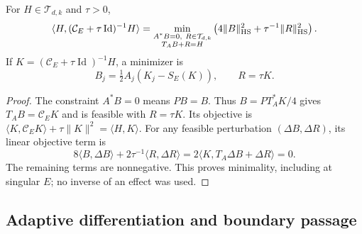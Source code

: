\begin{lemma}
\label{lem:horizontalenergy83}
For $H\in\mathcal T_{d,k}$ and $\tau>0$,
\begin{equation}\label{eq:energymin83}
 \langle H,(\mathcal C_E+\tau\operatorname{Id})^{-1}H\rangle
 =\min_{\substack{A^*B=0,\ R\in\mathcal T_{d,k}\\T_AB+R=H}}
       \left(4\|B\|_{\rm HS}^2+\tau^{-1}\|R\|_{\rm HS}^2\right).
\end{equation}
If $K=(\mathcal C_E+\tau\operatorname{Id})^{-1}H$, a minimizer is
\begin{equation}\label{eq:energyoptimizer83}
 B_j=\tfrac12 A_j(K_j-S_E(K)),\qquad R=\tau K.
\end{equation}
\end{lemma}
\begin{proof}
The constraint $A^*B=0$ means $PB=B$.  Thus
$B=PT_A^*K/4$ gives $T_AB=\mathcal C_EK$ and is feasible with
$R=\tau K$.  Its objective is
$\langle K,\mathcal C_EK\rangle+\tau\|K\|^2=\langle H,K\rangle$.
For any feasible perturbation $(\Delta B,\Delta R)$, its linear
objective term is
\[
 8\langle B,\Delta B\rangle+2\tau^{-1}\langle R,\Delta R\rangle
 =2\langle K,T_A\Delta B+\Delta R\rangle=0.
\]
The remaining terms are nonnegative.  This proves minimality,
including at singular $E$; no inverse of an effect was used.
\end{proof}

\subsection{Adaptive differentiation and boundary passage}

